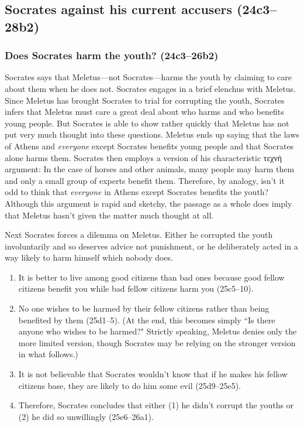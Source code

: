 \documentclass[11pt]{article}
\begin{document}



\subsection{Socrates against his current accusers (24c3--28b2)}

\subsubsection{Does Socrates harm the youth? (24c3--26b2)}

Socrates says that Meletus---not Socrates---harms the youth by claiming to care
about them when he does not. Socrates engages in a brief elenchus with Meletus.
Since Meletus has brought Socrates to trial for corrupting the youth, Socrates
infers that Meletus must care a great deal about who harms and who benefits
young people. But Socrates is able to show rather quickly that Meletus has not
put very much thought into these questions.  Meletus ends up saying that the
laws of Athens and \emph{everyone} except Socrates benefits young people and
that Socrates alone harms them.  Socrates then employs a version of his
characteristic {\g τεχνή} argument: In the case of horses and other animals,
many people may harm them and only a small group of experts benefit them.
Therefore, by analogy, isn't it odd to think that \emph{everyone} in Athens
except Socrates benefits the youth?  Although this argument is rapid and
sketchy, the passage as a whole does imply that Meletus hasn't given the matter
much thought at all.

Next Socrates forces a dilemma on Meletus. Either he corrupted the youth
involuntarily and so deserves advice not punishment, or he deliberately acted
in a way likely to harm himself which nobody does.

\begin{enumerate}
    \item It is better to live among good citizens than bad ones because good
        fellow citizens benefit you while bad fellow citizens harm you
        (25c5--10).
    \item No one wishes to be harmed by their fellow citizens rather than being
        benefited by them (25d1--5). (At the end, this becomes simply ``Is
        there anyone who wishes to be harmed?" Strictly speaking, Meletus
        denies only the more limited version, though Socrates may be relying on
        the stronger version in what follows.)
    \item It is not believable that Socrates wouldn't know that if he makes his
        fellow citizens base, they are likely to do him some evil (25d9--25e5).
    \item Therefore, Socrates concludes that either (1) he didn't corrupt the
        youths or (2) he did so unwillingly (25e6--26a1).
\end{enumerate}
\end{document}
